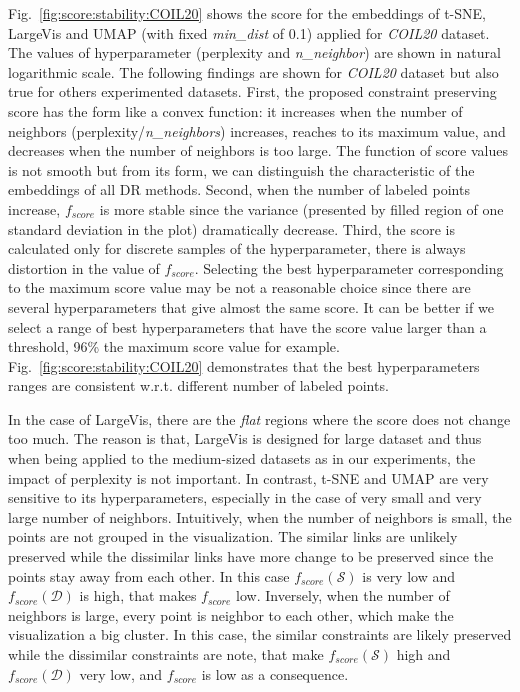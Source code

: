 Fig.~\ref{fig:score:stability:COIL20} shows the score for the embeddings of t-SNE, LargeVis and UMAP (with fixed \emph{min\_dist} of 0.1) applied for \emph{COIL20} dataset.
The values of hyperparameter (perplexity and \emph{n\_neighbor}) are shown in natural logarithmic scale.
The following findings are shown for \emph{COIL20} dataset but also true for others experimented datasets.
First, the proposed constraint preserving score has the form like a convex function: it increases when the number of neighbors (perplexity/\emph{n\_neighbors}) increases, reaches to its maximum value, and decreases when the number of neighbors is too large.
The function of score values is not smooth but from its form, we can distinguish the characteristic of the embeddings of all DR methods.
Second, when the number of labeled points increase, $f_{score}$ is more stable since the variance (presented by filled region of one standard deviation in the plot) dramatically decrease.
Third, the score is calculated only for discrete samples of the hyperparameter, there is always distortion in the value of $f_{score}$.
Selecting the best hyperparameter corresponding to the maximum score value may be not a reasonable choice since there are several hyperparameters that give almost the same score.
It can be better if we select a range of best hyperparameters that have the score value larger than a threshold, 96\% the maximum score value for example.
Fig.~\ref{fig:score:stability:COIL20} demonstrates that the best hyperparameters ranges are consistent w.r.t. different number of labeled points.

In the case of LargeVis, there are the \emph{flat} regions where the score does not change too much.
The reason is that, LargeVis is designed for large dataset and thus when being applied to the medium-sized datasets as in our experiments, the impact of perplexity is not important.
In contrast, t-SNE and UMAP are very sensitive to its hyperparameters, especially in the case of very small and very large number of neighbors.
Intuitively, when the number of neighbors is small, the points are not grouped in the visualization.
The similar links are unlikely preserved while the dissimilar links have more change to be preserved since the points stay away from each other.
In this case $f_{score}(\mathcal{S})$ is very low and $f_{score}(\mathcal{D})$ is high, that makes $f_{score}$ low.
Inversely, when the number of neighbors is large, every point is neighbor to each other, which make the visualization a big cluster.
In this case, the similar constraints are likely preserved while the dissimilar constraints are note, that make $f_{score}(\mathcal{S})$ high and $f_{score}(\mathcal{D})$ very low, and $f_{score}$ is low as a consequence.

